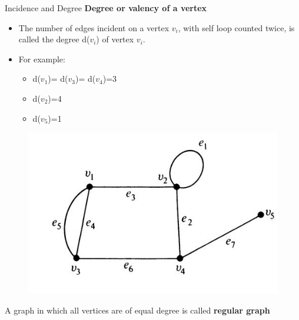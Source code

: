 \documentclass{beamer}
\begin{document}
\begin{frame}{Incidence and Degree}
	\textbf{Degree or valency of a vertex}
	\begin{itemize}
		\item The number of edges incident on a vertex $v_i$, with self loop counted 
		twice, is called the degree  d($v_i$) of vertex $v_i$.
		\item  For example:
		\begin{itemize}
			\item d($v_1$)= d($v_3$)= d($v_4$)=3
			\item d($v_2$)=4
			\item d($v_5$)=1
		\end{itemize}
	\end{itemize}
	\begin{figure}
		\includegraphics[scale=.6]{img/m17}
	\end{figure}
A graph in which all vertices are of equal 
degree is called \textbf{regular graph} 
\end{frame}
\end{document}
